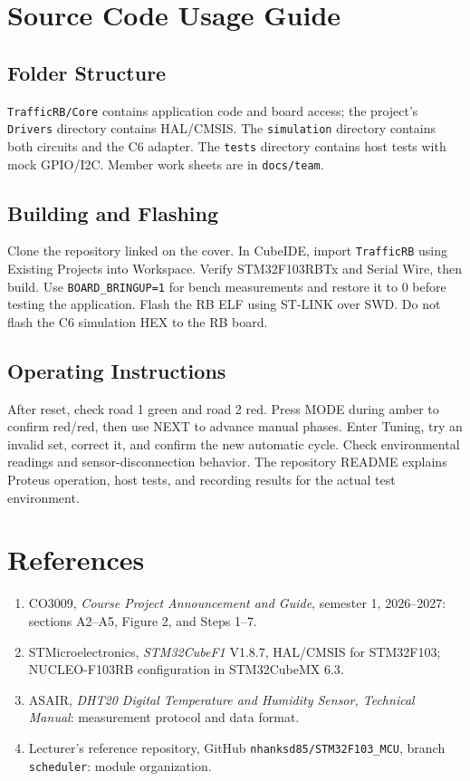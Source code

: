 \section{Source Code Usage Guide}
\subsection{Folder Structure}
\texttt{TrafficRB/Core} contains application code and board access; the project's \texttt{Drivers} directory contains HAL/CMSIS. The \texttt{simulation} directory contains both circuits and the C6 adapter. The \texttt{tests} directory contains host tests with mock GPIO/I2C. Member work sheets are in \texttt{docs/team}.

\subsection{Building and Flashing}
Clone the repository linked on the cover. In CubeIDE, import \texttt{TrafficRB} using Existing Projects into Workspace. Verify STM32F103RBTx and Serial Wire, then build. Use \texttt{BOARD\_BRINGUP=1} for bench measurements and restore it to 0 before testing the application. Flash the RB ELF using ST-LINK over SWD. Do not flash the C6 simulation HEX to the RB board.

\subsection{Operating Instructions}
After reset, check road 1 green and road 2 red. Press MODE during amber to confirm red/red, then use NEXT to advance manual phases. Enter Tuning, try an invalid set, correct it, and confirm the new automatic cycle. Check environmental readings and sensor-disconnection behavior. The repository README explains Proteus operation, host tests, and recording results for the actual test environment.

\section*{References}
\begin{enumerate}
\item CO3009, \emph{Course Project Announcement and Guide}, semester 1, 2026--2027: sections A2--A5, Figure 2, and Steps 1--7.
\item STMicroelectronics, \emph{STM32CubeF1} V1.8.7, HAL/CMSIS for STM32F103; NUCLEO-F103RB configuration in STM32CubeMX 6.3.
\item ASAIR, \emph{DHT20 Digital Temperature and Humidity Sensor, Technical Manual}: measurement protocol and data format.
\item Lecturer's reference repository, GitHub \texttt{nhanksd85/STM32F103\_MCU}, branch \texttt{scheduler}: module organization.
\end{enumerate}
